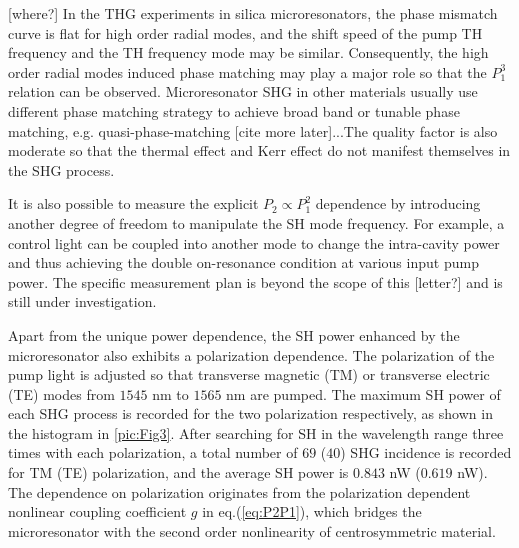 \documentclass[a4paper,8pt,hyperref, twocolumn]{article}
\begin{document}
[where?]
In the THG experiments in silica microresonators\cite{carmon2007visible, farnesi2014optical}, the phase mismatch curve is flat for high order radial modes, and the shift speed of the pump TH frequency and the TH frequency mode may be similar. Consequently, the high order radial modes induced phase matching may play a major role so that the $P_1^3$ relation can be observed. Microresonator SHG in other materials usually use different phase matching strategy to achieve broad band or tunable phase matching, e.g. quasi-phase-matching [cite more later]...The quality factor is also moderate so that the thermal effect and Kerr effect do not manifest themselves in the SHG process.


It is also possible to measure the explicit $P_2 \propto P_1^2$ dependence by introducing another degree of freedom to manipulate the SH mode frequency. 
For example, a control light can be coupled into another mode to change the intra-cavity power and thus achieving the double on-resonance condition at various input pump power. 
The specific measurement plan is beyond the scope of this [letter?] and is still under investigation.







Apart from the unique power dependence, the SH power enhanced by the microresonator also exhibits a polarization dependence. 
The polarization of the pump light is adjusted so that transverse magnetic (TM) or transverse electric (TE) modes from $1545$ nm to $1565$ nm are pumped. 
The maximum SH power of each SHG process is recorded for the two polarization respectively, as shown in the histogram in \ref{pic:Fig3}. After searching for SH in the wavelength range three times with each polarization, a total number of $69$ ($40$) SHG incidence is recorded for TM (TE) polarization, and the average SH power is $0.843$ nW ($0.619$ nW). 
The dependence on polarization originates from the polarization dependent nonlinear coupling coefficient $g$ in eq.(\ref{eq:P2P1}), which bridges the microresonator with the second order nonlinearity of centrosymmetric material. 
\end{document}

